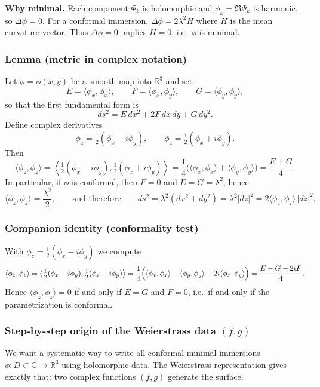 \documentclass[12pt,a4paper]{article}
\theoremstyle{plain}
\theoremstyle{definition}      %
\begin{document}
\smallskip
\textbf{Why minimal.}
Each component $\Psi_k$ is holomorphic and $\phi_k=\Re\Psi_k$ is harmonic, so $\Delta\phi=0$.
For a conformal immersion, $\Delta\phi=2\lambda^2 H$ where $H$ is the mean curvature vector.
Thus $\Delta\phi=0$ implies $H=0$, i.e.\ $\phi$ is minimal.

\medskip

\subsubsection*{Lemma (metric in complex notation)}
Let $\phi=\phi(x,y)$ be a smooth map into $\mathbb R^3$ and set
\[
E=\langle \phi_x,\phi_x\rangle,\qquad
F=\langle \phi_x,\phi_y\rangle,\qquad
G=\langle \phi_y,\phi_y\rangle,
\]
so that the first fundamental form is
\[
ds^2=E\,dx^2+2F\,dx\,dy+G\,dy^2.
\]
Define complex derivatives
\[
\phi_z=\tfrac12(\phi_x-i\phi_y),\qquad
\phi_{\bar z}=\tfrac12(\phi_x+i\phi_y).
\]
Then
\[
\langle \phi_z,\phi_{\bar z}\rangle
=
\left\langle \tfrac12(\phi_x-i\phi_y),\tfrac12(\phi_x+i\phi_y)\right\rangle
=
\frac14\bigl(\langle \phi_x,\phi_x\rangle+\langle \phi_y,\phi_y\rangle\bigr)
=
\frac{E+G}{4}.
\]
In particular, if $\phi$ is conformal, then $F=0$ and $E=G=\lambda^2$, hence
\[
\langle \phi_z,\phi_{\bar z}\rangle=\frac{\lambda^2}{2},
\qquad\text{and therefore}\qquad
ds^2=\lambda^2(dx^2+dy^2)=\lambda^2|dz|^2
=
2\langle \phi_z,\phi_{\bar z}\rangle\,|dz|^2.
\]

\medskip

\subsubsection*{Companion identity (conformality test)}
With $\phi_z=\tfrac12(\phi_x-i\phi_y)$ we compute
\[
\langle \phi_z,\phi_z\rangle
=
\left\langle \tfrac12(\phi_x-i\phi_y),\tfrac12(\phi_x-i\phi_y)\right\rangle
=
\frac14\Bigl(\langle \phi_x,\phi_x\rangle-\langle \phi_y,\phi_y\rangle-2i\langle \phi_x,\phi_y\rangle\Bigr)
=
\frac{E-G-2iF}{4}.
\]
Hence $\langle \phi_z,\phi_z\rangle=0$ if and only if $E=G$ and $F=0$, i.e.\ if and only if the parametrization is conformal.

\medskip

\subsubsection*{Step-by-step origin of the Weierstrass data $(f,g)$}

We want a systematic way to write all conformal minimal immersions
$\phi : D \subset \mathbb{C} \to \mathbb{R}^3$ using holomorphic data.
The Weierstrass representation gives exactly that: two complex functions $(f,g)$ generate the surface.
\end{document}
